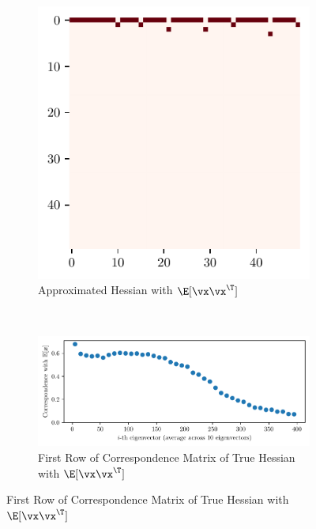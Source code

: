 \begin{figure}[H]
\begin{subfigure}[b]{0.24\textwidth}
        \includegraphics[width=\textwidth]{Appendix_Figures/Overlap_large_model/FailExplanation/VGGlate/xxT_Approxest_real_corr_expand_t50_CIFAR10_Exp1_VGG11W200_fxlr0.01_E-1_features.3.pdf}
        \caption{Approximated Hessian with $\E[\vx\vx^\T]$}
        \label{fig:app_adexp_vgg2_corr_est}
    \end{subfigure}\\
    \vspace{0.15in}
    \begin{subfigure}[b]{0.49\textwidth}
        \centering
        \captionsetup{justification=centering}
        \includegraphics[width=\textwidth]{Appendix_Figures/Overlap_large_model/FailExplanation/VGGlate/FL_xxT_Trueest_real_corr_expand_t400_CIFAR10_Exp1_VGG11W200_fxlr0.01_E-1_features.3.pdf}
        \caption{First Row of Correspondence Matrix of True Hessian with $\E[\vx\vx^\T]$}

\end{subfigure}
\end{figure}
